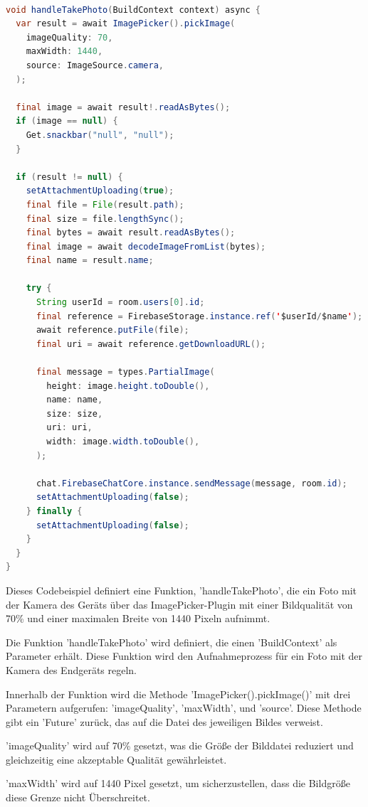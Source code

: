 \begin{lstlisting}[language=Java,caption=Aufnahmeprozess für ein Foto,label=lst:foto]  

void handleTakePhoto(BuildContext context) async {
  var result = await ImagePicker().pickImage(
    imageQuality: 70,
    maxWidth: 1440,
    source: ImageSource.camera,
  );

  final image = await result!.readAsBytes();
  if (image == null) {
    Get.snackbar("null", "null");
  }

  if (result != null) {
    setAttachmentUploading(true);
    final file = File(result.path);
    final size = file.lengthSync();
    final bytes = await result.readAsBytes();
    final image = await decodeImageFromList(bytes);
    final name = result.name;

    try {
      String userId = room.users[0].id;
      final reference = FirebaseStorage.instance.ref('$userId/$name');
      await reference.putFile(file);
      final uri = await reference.getDownloadURL();

      final message = types.PartialImage(
        height: image.height.toDouble(),
        name: name,
        size: size,
        uri: uri,
        width: image.width.toDouble(),
      );

      chat.FirebaseChatCore.instance.sendMessage(message, room.id);
      setAttachmentUploading(false);
    } finally {
      setAttachmentUploading(false);
    }
  }
}

\end{lstlisting}

Dieses Codebeispiel definiert eine Funktion, 'handleTakePhoto', die ein Foto mit der Kamera des Geräts über das ImagePicker-Plugin mit einer Bildqualität von 70\% und einer maximalen Breite von 1440 Pixeln aufnimmt.

Die Funktion 'handleTakePhoto' wird definiert, die einen 'BuildContext' als Parameter erhält. Diese Funktion wird den Aufnahmeprozess für ein Foto mit der Kamera des Endgeräts regeln.

Innerhalb der Funktion wird die Methode 'ImagePicker().pickImage()' mit drei Parametern aufgerufen: 'imageQuality', 'maxWidth', und 'source'. Diese Methode gibt ein 'Future' zurück, das auf die Datei des jeweiligen Bildes verweist.

'imageQuality' wird auf 70\% gesetzt, was die Größe der Bilddatei reduziert und gleichzeitig eine akzeptable Qualität gewährleistet.

'maxWidth' wird auf 1440 Pixel gesetzt, um sicherzustellen, dass die Bildgröße diese Grenze nicht Überschreitet.


